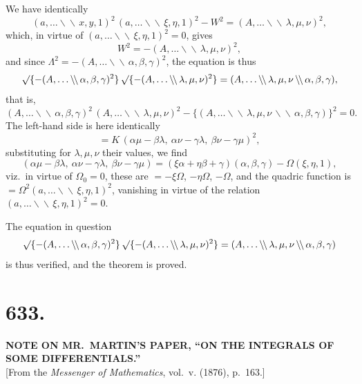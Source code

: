 \documentclass[12pt,a4paper]{article}
\begin{document}
We have identically
\[
(a, \ldots\backslash\!\backslash\, x, y, 1)^2\, (a, \ldots\backslash\!\backslash\, \xi, \eta, 1)^2 - W^2 = (A, \ldots\backslash\!\backslash\, \lambda, \mu, \nu)^2,
\]
which, in virtue of $(a, \ldots\backslash\!\backslash\, \xi, \eta, 1)^2 = 0$, gives
\[
W^2 = -(A, \ldots\backslash\!\backslash\, \lambda, \mu, \nu)^2,
\]
and since $\Lambda^2 = -(A, \ldots\backslash\!\backslash\, \alpha, \beta, \gamma)^2$, the equation is thus
\[
\surd\{-(A, \ldots\backslash\!\backslash\, \alpha, \beta, \gamma)^2\}\, \surd\{-(A, \ldots\backslash\!\backslash\, \lambda, \mu, \nu)^2\} = (A, \ldots\backslash\!\backslash\, \lambda, \mu, \nu\,\backslash\!\backslash\, \alpha, \beta, \gamma),
\]
that is,
\[
(A, \ldots\backslash\!\backslash\, \alpha, \beta, \gamma)^2\, (A, \ldots\backslash\!\backslash\, \lambda, \mu, \nu)^2 - \{(A, \ldots\backslash\!\backslash\, \lambda, \mu, \nu\,\backslash\!\backslash\, \alpha, \beta, \gamma)\}^2 = 0.
\]
The left-hand side is here identically
\[
= K\, (\alpha \mu - \beta \lambda,\ \alpha \nu - \gamma \lambda,\ \beta \nu - \gamma \mu)^2,
\]
substituting for $\lambda, \mu, \nu$ their values, we find
\[
(\alpha \mu - \beta \lambda,\ \alpha \nu - \gamma \lambda,\ \beta \nu - \gamma \mu) = (\xi \alpha + \eta \beta + \gamma)(\alpha, \beta, \gamma) - \Omega(\xi, \eta, 1),
\]
viz.\ in virtue of $\Omega_0 = 0$, these are $= -\xi\Omega$, $-\eta\Omega$, $-\Omega$, and the quadric function is $= \Omega^2 (a, \ldots\backslash\!\backslash\, \xi, \eta, 1)^2$, vanishing in virtue of the relation $(a, \ldots\backslash\!\backslash\, \xi, \eta, 1)^2 = 0$.

The equation in question
\[
\surd\{-(A, \ldots\backslash\!\backslash\, \alpha, \beta, \gamma)^2\}\, \surd\{-(A, \ldots\backslash\!\backslash\, \lambda, \mu, \nu)^2\} = (A, \ldots\backslash\!\backslash\, \lambda, \mu, \nu\,\backslash\!\backslash\, \alpha, \beta, \gamma)
\]
is thus verified, and the theorem is proved.

\clearpage
\setcounter{page}{15}

\section*{633.}

\begin{center}
\textbf{NOTE ON MR.~MARTIN'S PAPER, ``ON THE INTEGRALS OF SOME DIFFERENTIALS.''}\\[1em]
[From the \textit{Messenger of Mathematics}, vol.~v. (1876), p.~163.]
\end{center}
\end{document}
